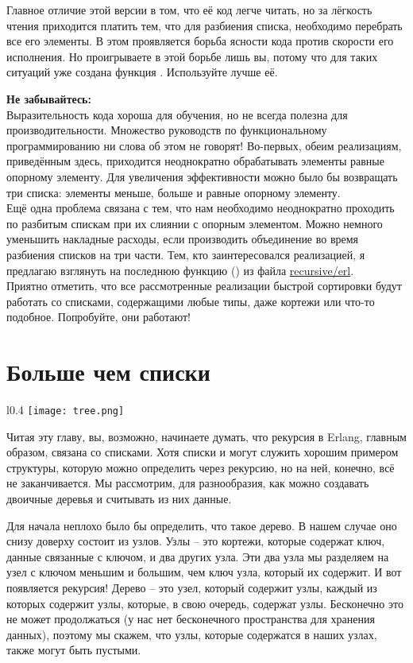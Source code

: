 Главное отличие этой версии в том, что её код легче читать, но за лёгкость чтения приходится платить тем, что для разбиения списка, необходимо перебрать все его элементы.
В этом проявляется борьба ясности кода против скорости его исполнения.
Но проигрываете в этой борьбе лишь вы, потому что для таких ситуаций уже создана функция .
Используйте лучше её.\\
\colorbox{lorange}
{
    \begin{minipage}{1.0\linewidth}
\textbf{Не забывайтесь:}\\
Выразительность кода хороша для обучения, но не всегда полезна для производительности.
Множество руководств по функциональному программированию ни слова об этом не говорят!
Во\--первых, обеим реализациям, приведённым здесь, приходится неоднократно обрабатывать элементы равные опорному элементу.
Для увеличения эффективности можно было бы возвращать три списка: элементы меньше, больше и равные опорному элементу.\\
Ещё одна проблема связана с тем, что нам необходимо неоднократно проходить по разбитым спискам при их слиянии с опорным элементом.
Можно немного уменьшить накладные расходы, если производить объединение во время разбиения списков на три части.
Тем, кто заинтересовался реализацией, я предлагаю взглянуть на последнюю функцию () из файла \href{http://learnyousomeerlang.com/static/erlang/recursive.erl}{recursive/erl}.\\
Приятно отметить, что все рассмотренные реализации быстрой сортировки будут работать со списками, содержащими любые типы, даже кортежи или что\--то подобное.
Попробуйте, они работают!
    \end{minipage}
}
\section{Больше чем списки}
\begin{wrapfigure}{l}{0.4\linewidth}
    \texttt{[image: tree.png]}
\end{wrapfigure}
Читая эту главу, вы, возможно, начинаете думать, что рекурсия в Erlang, главным образом, связана со списками.
Хотя списки и могут служить хорошим примером структуры, которую можно определить через рекурсию, но на ней, конечно, всё не заканчивается.
Мы рассмотрим, для разнообразия, как можно создавать двоичные деревья и считывать из них данные.

Для начала неплохо было бы определить, что такое дерево.
В нашем случае оно снизу доверху состоит из узлов.
Узлы \--- это кортежи, которые содержат ключ, данные связанные с ключом, и два других узла.
Эти два узла мы разделяем на узел с ключом меньшим и большим, чем ключ узла, который их содержит.
И вот появляется рекурсия!
Дерево \--- это узел, который содержит узлы, каждый из которых содержит узлы, которые, в свою очередь, содержат узлы.
Бесконечно это не может продолжаться (у нас нет бесконечного пространства для хранения данных), поэтому мы скажем, что узлы, которые содержатся в наших узлах, также могут быть пустыми.

